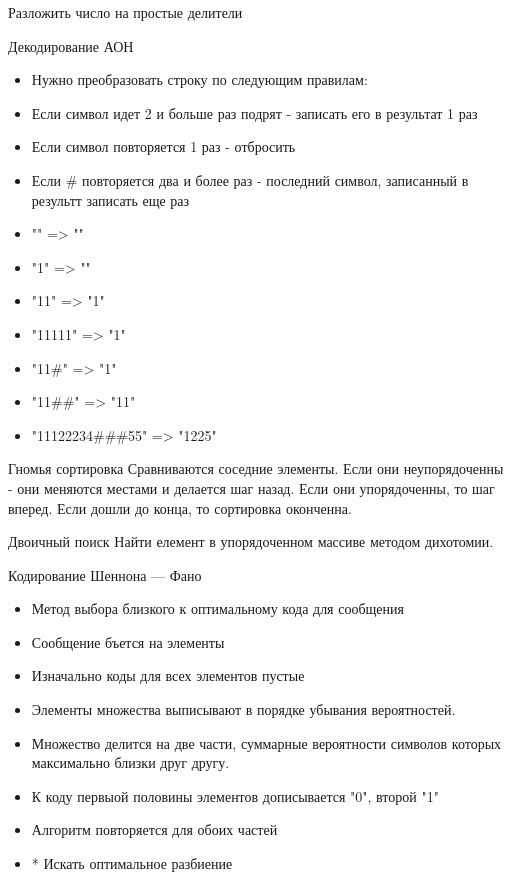 \documentclass{article}
\begin{document}
\LARGE

{\center Разложить число на простые делители}
\newpage

{\center Декодирование АОН}
\begin{itemize}
    \item Нужно преобразовать строку по следующим правилам:
    \item Если символ идет 2 и больше раз подрят - записать его в результат 1 раз
    \item Если символ повторяется 1 раз - отбросить
    \item Если # повторяется два и более раз - последний символ, записанный в результт записать еще раз
    \item "" => ""
    \item "1" => ""
    \item "11" => "1"
    \item "11111" => "1"
    \item "11#" => "1"
    \item "11##" => "11"
    \item "11122234\#\#\#55" => "1225"
\end{itemize}
\newpage

{\center Гномья сортировка}
Сравниваются соседние элементы. Если они неупорядоченны - они меняются местами и делается шаг назад.
Если они упорядоченны, то шаг вперед. Если дошли до конца, то сортировка оконченна.
\newpage

{\center Двоичный поиск}
Найти елемент в упорядоченном массиве методом дихотомии.
\newpage

{\center Кодирование Шеннона — Фано}
\begin{itemize}
    \item Метод выбора близкого к оптимальному кода для сообщения
    \item Сообщение бъется на элементы
    \item Изначально коды для всех элементов пустые
    \item Элементы множества выписывают в порядке убывания вероятностей.
    \item Множество делится на две части, суммарные вероятности символов которых
            максимально близки друг другу.
    \item К коду первыой половины элементов дописывается "0", второй "1"
    \item Алгоритм повторяется для обоих частей
    \item * Искать оптимальное разбиение
\end{itemize}
\newpage
\end{document}
